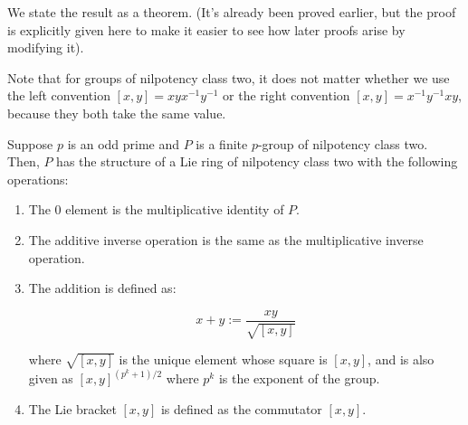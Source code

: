 \documentclass[10pt]{amsart}
\begin{document}
We state the result as a theorem. (It's already been proved earlier,
but the proof is explicitly given here to make it easier to see how
later proofs arise by modifying it).

Note that for groups of nilpotency class two, it does not matter
whether we use the left convention $[x,y] = xyx^{-1}y^{-1}$ or the
right convention $[x,y] = x^{-1}y^{-1}xy$, because they both take the
same value.

\begin{theorem}
  Suppose $p$ is an odd prime and $P$ is a finite $p$-group of
  nilpotency class two. Then, $P$ has the structure of a Lie ring of
  nilpotency class two with the following operations:

  \begin{enumerate}
  \item The $0$ element is the multiplicative identity of $P$.
  \item The additive inverse operation is the same as the
    multiplicative inverse operation.
  \item The addition is defined as:

    $$x + y := \frac{xy}{\sqrt{[x,y]}}$$

    where $\sqrt{[x,y]}$ is the unique element whose square is
    $[x,y]$, and is also given as $[x,y]^{(p^k + 1)/2}$ where $p^k$ is
    the exponent of the group.
  \item The Lie bracket $[x,y]$ is defined as the commutator $[x,y]$.
  \end{enumerate}
\end{theorem}
\end{document}
